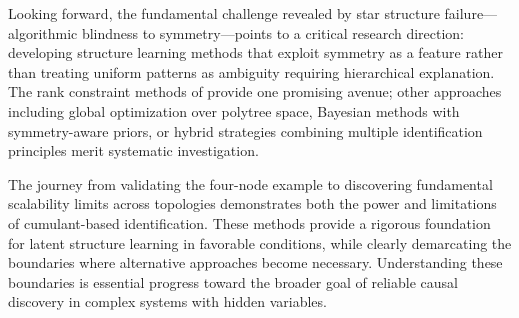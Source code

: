 \documentclass[11pt,a4paper]{article}
\numberwithin{equation}{section}
\begin{document}
Looking forward, the fundamental challenge revealed by star structure failure—algorithmic blindness to symmetry—points to a critical research direction: developing structure learning methods that exploit symmetry as a feature rather than treating uniform patterns as ambiguity requiring hierarchical explanation. The rank constraint methods of \citet{cai:etal:2024:rank} provide one promising avenue; other approaches including global optimization over polytree space, Bayesian methods with symmetry-aware priors, or hybrid strategies combining multiple identification principles merit systematic investigation.

The journey from validating the four-node example to discovering fundamental scalability limits across topologies demonstrates both the power and limitations of cumulant-based identification. These methods provide a rigorous foundation for latent structure learning in favorable conditions, while clearly demarcating the boundaries where alternative approaches become necessary. Understanding these boundaries is essential progress toward the broader goal of reliable causal discovery in complex systems with hidden variables.


\end{document}

